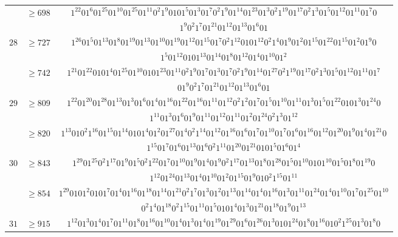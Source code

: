 \documentclass[final,3p,times]{elsarticle}
\theoremstyle{definition}
\begin{document}
\begin{appendix}
{\begin{longtable}[c]{|c|c|c|}
& $\geq 698$ & $1^{22}01^{6}01^{25}01^{10}01^{25}01^{11}0^{2}1^{9}0101^{5}01^{3}01^{7}0^{2}1^{9}01^{14}01^{23}01^{3}0^{2}1^{19}01^{17}0^{2}1^{3}01^{5}01^{12}01^{11}01^{7}0$\\[-2ex]
&& $1^{9}0^{2}1^{7}01^{21}01^{12}01^{13}01^{6}01$\\
\hline
$28$ & $\geq 727$ & $1^{26}01^{5}01^{13}01^{8}01^{19}01^{13}01^{10}01^{19}01^{12}01^{15}01^{7}0^{2}1^{12}0101^{12}0^{2}1^{4}01^{9}01^{2}01^{15}01^{22}01^{15}01^{2}01^{9}0$\\[-2ex]
&& $1^{5}01^{12}0101^{13}01^{14}01^{8}01^{12}01^{4}01^{10}01^{2}$\\[-1ex]
& $\geq 742$ & $1^{21}01^{22}0101^{4}01^{25}01^{10}0101^{23}01^{11}0^{2}1^{9}01^{7}01^{3}01^{7}0^{2}1^{9}01^{14}01^{27}0^{2}1^{19}01^{17}0^{2}1^{3}01^{5}01^{12}01^{11}01^{7}$\\[-2ex]
&& $01^{9}0^{2}1^{7}01^{21}01^{12}01^{13}01^{6}01$\\
\hline
$29$ & $\geq 809$ & $1^{22}01^{20}01^{28}01^{13}01^{3}01^{6}01^{4}01^{16}01^{22}01^{16}01^{11}01^{12}0^{2}1^{2}01^{7}01^{5}01^{10}01^{11}01^{3}01^{5}01^{22}0101^{3}01^{24}0$\\[-2ex]
&& $1^{11}01^{3}01^{6}01^{9}01^{11}01^{12}01^{11}01^{2}01^{24}0^{2}1^{3}01^{12}$\\[-1ex]
& $\geq 820$ & $1^{13}010^{2}1^{16}01^{15}01^{14}0101^{4}01^{2}01^{27}01^{4}0^{2}1^{14}01^{12}01^{16}01^{6}01^{7}01^{10}01^{7}01^{6}01^{16}01^{12}01^{20}01^{9}01^{4}01^{21}0$\\[-2ex]
&& $1^{15}01^{7}01^{6}01^{13}01^{6}0^{2}1^{11}01^{20}01^{21}0101^{5}01^{6}01^{4}$\\
\hline
$30$ & $\geq 843$ & $1^{29}01^{25}0^{2}1^{17}01^{9}01^{5}0^{2}1^{22}01^{7}01^{10}01^{9}01^{4}01^{9}0^{2}1^{17}01^{13}01^{8}01^{28}01^{5}01^{10}0101^{10}01^{5}01^{8}01^{19}0$\\[-2ex]
&& $1^{12}01^{24}01^{13}01^{4}01^{10}01^{2}01^{15}01^{9}010^{2}1^{15}01^{11}$\\[-1ex]
& $\geq 854$ & $1^{29}0101^{2}0101^{7}01^{4}01^{16}01^{18}01^{14}01^{21}0^{2}1^{7}01^{3}01^{2}01^{13}01^{14}01^{4}01^{16}01^{3}01^{11}01^{24}01^{4}01^{10}01^{7}01^{25}01^{10}$\\[-2ex]
&& $0^{2}1^{4}01^{18}0^{2}1^{15}01^{11}01^{5}0101^{4}01^{3}01^{21}01^{18}01^{9}01^{13}$\\
\hline
$31$ & $\geq 915$ & $1^{12}01^{3}01^{4}01^{7}01^{11}01^{8}01^{16}01^{10}01^{4}01^{3}01^{4}01^{19}01^{29}01^{6}01^{26}01^{3}0101^{24}01^{8}01^{16}010^{2}1^{25}01^{3}01^{8}0$\\[-2ex]

\end{longtable}}
\end{appendix}
\end{document}
